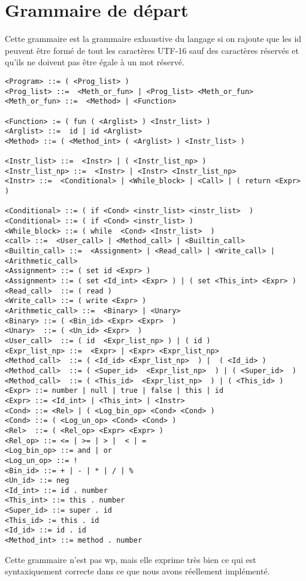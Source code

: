 \section{Grammaire de départ}
Cette grammaire est la grammaire exhaustive du langage si on rajoute que les id peuvent être formé de tout les caractères UTF-16 sauf des caractères réservés et qu'ils ne doivent pas être égale à un mot réservé.
{\small
\begin{verbatim}
<Program> ::= ( <Prog_list> )
<Prog_list> ::=  <Meth_or_fun> | <Prog_list> <Meth_or_fun>	
<Meth_or_fun> ::=  <Method> | <Function>

<Function> := ( fun ( <Arglist> ) <Instr_list> ) 
<Arglist> ::=  id | id <Arglist>
<Method> ::= ( <Method_int> ( <Arglist> ) <Instr_list> )
 
<Instr_list> ::=  <Instr> | ( <Instr_list_np> ) 
<Instr_list_np> ::=  <Instr> | <Instr> <Instr_list_np>
<Instr> ::=  <Conditional> | <While_block> | <Call> | ( return <Expr> ) 

<Conditional> ::= ( if <Cond> <instr_list> <instr_list>  )  
<Conditional> ::= ( if <Cond> <instr_list> )
<While_block> ::= ( while  <Cond> <Instr_list>  ) 
<call> ::=  <User_call> | <Method_call> | <Builtin_call> 
<Builtin_call> ::=  <Assignment> | <Read_call> | <Write_call> | <Arithmetic_call>
<Assignment> ::= ( set id <Expr> ) 
<Assignment> ::= ( set <Id_int> <Expr> ) | ( set <This_int> <Expr> )
<Read_call>  ::= ( read )
<Write_call> ::= ( write <Expr> )
<Arithmetic_call> ::=  <Binary> | <Unary>
<Binary> ::= ( <Bin_id> <Expr> <Expr>  )
<Unary>  ::= ( <Un_id> <Expr>  )
<User_call>  ::= ( id  <Expr_list_np> ) | ( id ) 
<Expr_list_np> ::=  <Expr> | <Expr> <Expr_list_np>
<Method_call>  ::= ( <Id_id> <Expr_list_np>  ) |  ( <Id_id> )   
<Method_call>  ::= ( <Super_id>  <Expr_list_np>  ) | ( <Super_id>  )
<Method_call>  ::= ( <This_id>  <Expr_list_np>  ) | ( <This_id> )
<Expr> ::= number | null | true | false | this | id 
<Expr> ::= <Id_int> | <This_int> | <Instr>
<Cond> ::= <Rel> | ( <Log_bin_op> <Cond> <Cond> )
<Cond> ::= ( <Log_un_op> <Cond> <Cond> )
<Rel>  ::= ( <Rel_op> <Expr> <Expr> ) 
<Rel_op> ::= <= | >= | > |  < | =
<Log_bin_op> ::= and | or
<Log_un_op> ::= !
<Bin_id> ::= + | - | * | / | %
<Un_id> ::= neg
<Id_int> ::= id . number
<This_int> ::= this . number
<Super_id> ::= super . id
<This_id> := this . id 
<Id_id> ::= id . id
<Method_int> ::= method . number
\end{verbatim}}
Cette grammaire n'est pas wp, mais elle exprime très bien ce qui est syntaxiquement correcte dans ce que nous avons réellement implémenté. 

